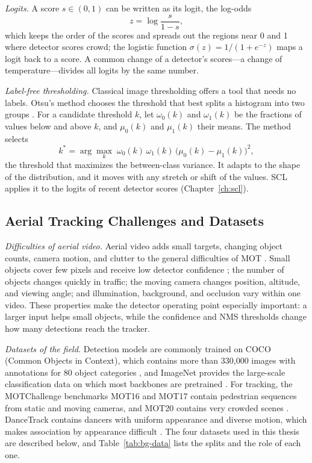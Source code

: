 \emph{Logits.} A score $s\in(0,1)$ can be written as its logit, the log-odds
\begin{equation}
z=\log\frac{s}{1-s},
\label{eq:bg-logit}
\end{equation}
which keeps the order of the scores and spreads out the regions near 0 and 1 where detector scores crowd; the logistic function $\sigma(z)=1/(1+e^{-z})$ maps a logit back to a score. A common change of a detector's scores---a change of temperature---divides all logits by the same number.

\emph{Label-free thresholding.} Classical image thresholding offers a tool that needs no labels. Otsu's method chooses the threshold that best splits a histogram into two groups \cite{goh2018otsu}. For a candidate threshold $k$, let $\omega_0(k)$ and $\omega_1(k)$ be the fractions of values below and above $k$, and $\mu_0(k)$ and $\mu_1(k)$ their means. The method selects
\begin{equation}
k^{*}=\arg\max_{k}\;\omega_0(k)\,\omega_1(k)\,\bigl(\mu_0(k)-\mu_1(k)\bigr)^2,
\label{eq:bg-otsu}
\end{equation}
the threshold that maximizes the between-class variance. It adapts to the shape of the distribution, and it moves with any stretch or shift of the values. SCL applies it to the logits of recent detector scores (Chapter~\ref{ch:scl}).

\subsection{Aerial Tracking Challenges and Datasets}\label{sec:bg-datasets}
\emph{Difficulties of aerial video.} Aerial video adds small targets, changing object counts, camera motion, and clutter to the general difficulties of MOT \cite{zhu2022visdrone,du2018uavdt}. Small objects cover few pixels and receive low detector confidence \cite{cheng2023smallobject}; the number of objects changes quickly in traffic; the moving camera changes position, altitude, and viewing angle; and illumination, background, and occlusion vary within one video. These properties make the detector operating point especially important: a larger input helps small objects, while the confidence and NMS thresholds change how many detections reach the tracker.

\emph{Datasets of the field.} Detection models are commonly trained on COCO (Common Objects in Context), which contains more than 330,000 images with annotations for 80 object categories \cite{lin2014coco}, and ImageNet provides the large-scale classification data on which most backbones are pretrained \cite{russakovsky2015imagenet}. For tracking, the MOTChallenge benchmarks MOT16 and MOT17 \cite{milan2016mot16,dendorfer2021motchallenge} contain pedestrian sequences from static and moving cameras, and MOT20 contains very crowded scenes \cite{dendorfer2020mot20}. DanceTrack contains dancers with uniform appearance and diverse motion, which makes association by appearance difficult \cite{sun2022dancetrack}. The four datasets used in this thesis are described below, and Table~\ref{tab:bg-data} lists the splits and the role of each one.

